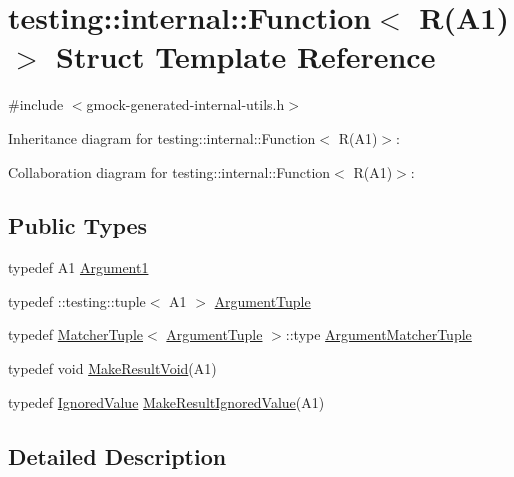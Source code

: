 \hypertarget{structtesting_1_1internal_1_1_function_3_01_r_07_a1_08_4}{}\section{testing\+:\+:internal\+:\+:Function$<$ R(A1)$>$ Struct Template Reference}
\label{structtesting_1_1internal_1_1_function_3_01_r_07_a1_08_4}


{\ttfamily \#include $<$gmock-\/generated-\/internal-\/utils.\+h$>$}



Inheritance diagram for testing\+:\+:internal\+:\+:Function$<$ R(A1)$>$\+:


Collaboration diagram for testing\+:\+:internal\+:\+:Function$<$ R(A1)$>$\+:
\subsection*{Public Types}
\begin{DoxyCompactItemize}
\item 
typedef A1 \hyperlink{structtesting_1_1internal_1_1_function_3_01_r_07_a1_08_4_aca36c8586218fd015cc4736dc8d4c14f}{Argument1}
\item 
typedef \+::testing\+::tuple$<$ A1 $>$ \hyperlink{structtesting_1_1internal_1_1_function_3_01_r_07_a1_08_4_afd48881a58d72658e547a170fb0f2087}{Argument\+Tuple}
\item 
typedef \hyperlink{structtesting_1_1internal_1_1_matcher_tuple}{Matcher\+Tuple}$<$ \hyperlink{structtesting_1_1internal_1_1_function_3_01_r_07_08_4_ad483c3128c470d8cdb55c3ac1c575c11}{Argument\+Tuple} $>$\+::type \hyperlink{structtesting_1_1internal_1_1_function_3_01_r_07_a1_08_4_a0e35671ae43c3d3310893e1d6d895d06}{Argument\+Matcher\+Tuple}
\item 
typedef void \hyperlink{structtesting_1_1internal_1_1_function_3_01_r_07_a1_08_4_aab10495172953eb51fc3940c4c1e890a}{Make\+Result\+Void}(A1)
\item 
typedef \hyperlink{classtesting_1_1internal_1_1_ignored_value}{Ignored\+Value} \hyperlink{structtesting_1_1internal_1_1_function_3_01_r_07_a1_08_4_a8fa56b9e05cb029ec7c8415ee352f865}{Make\+Result\+Ignored\+Value}(A1)
\end{DoxyCompactItemize}


\subsection{Detailed Description}

